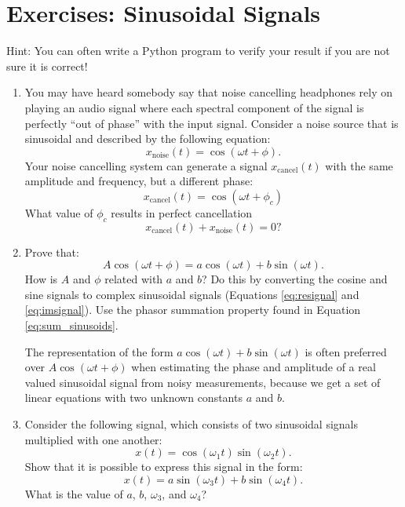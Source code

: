 \newpage
\section{Exercises: Sinusoidal Signals}

Hint: You can often write a Python program to verify your result if you are not sure it is correct!

\begin{enumerate}

\item You may have heard somebody say that noise cancelling headphones
  rely on playing an audio signal where each spectral component of the
  signal is perfectly ``out of phase'' with the input signal. Consider
  a noise source that is sinusoidal and described by the following
  equation:
\begin{equation}
x_{\mathrm{noise}}(t) = \cos(\omega t + \phi).
\end{equation}
Your noise cancelling system can generate a signal
$x_{\mathrm{cancel}}(t)$ with the same amplitude and frequency, but a different phase:
\begin{equation}
x_{\mathrm{cancel}}(t) = \cos(\omega t + \phi_c)
\end{equation}
What value of $\phi_c$ results in perfect cancellation
\begin{equation}
  x_{\mathrm{cancel}}(t) + x_{\mathrm{noise}}(t) = 0?
\end{equation}

\item Prove that:
\begin{equation}
A\cos(\omega t + \phi) = a\cos(\omega t) + b\sin(\omega t). 
\end{equation}
How is $A$ and $\phi$ related with $a$ and $b$? Do this by converting the cosine and sine signals to complex sinusoidal signals (Equations \ref{eq:resignal} and \ref{eq:imsignal}). Use the phasor summation property found in Equation \ref{eq:sum_sinusoids}.

The representation of the form $a\cos(\omega t) + b\sin(\omega t)$ is often preferred over $A\cos(\omega t + \phi)$ when estimating the phase and amplitude of a real valued sinusoidal signal from noisy measurements, because we get a set of linear equations with two unknown constants $a$ and $b$.

\item Consider the following signal, which consists of two sinusoidal signals multiplied with one another:
\begin{equation}
x(t) = \cos(\omega_1 t)\sin(\omega_2 t).
\end{equation}
Show that it is possible to express this signal in the form:
\begin{equation}
x(t) = a \sin (\omega_3 t) + b \sin(\omega_4 t).
\end{equation}
What is the value of $a$, $b$, $\omega_3$, and $\omega_4$?



\end{enumerate}
